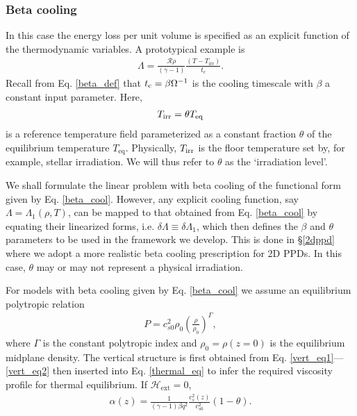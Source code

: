 \subsubsection{Beta cooling}
In this case the energy loss per unit volume is specified 
as an explicit function of the thermodynamic variables. 
A prototypical example is 
\begin{align}\label{beta_cool}
  \Lambda =
  \frac{\mathcal{R}\rho}{(\gamma-1)}\frac{\left(T-T_\mathrm{irr}\right)}{t_c}. 
\end{align}
Recall from Eq. \ref{beta_def} that 
  $t_\mathrm{c} = \beta\Omega^{-1}$ is 
the cooling timescale with $\beta$ a constant input parameter. Here, 
\begin{align}
  T_\mathrm{irr} = \theta T_\mathrm{eq}
\end{align}
is a reference temperature field parameterized as a constant 
fraction $\theta$ of the equilibrium temperature
$T_\mathrm{eq}$. Physically, $T_\mathrm{irr}$ is the floor temperature set by,
for example, stellar irradiation. We will thus refer to $\theta$ as
the `irradiation level'. %

We shall formulate the linear problem with beta cooling of the
functional form given by Eq. \ref{beta_cool}. However, any explicit cooling function, say
$\Lambda=\Lambda_1(\rho,T)$, can be mapped to that obtained from
Eq. \ref{beta_cool} by equating their linearized forms, i.e. $\delta
\Lambda \equiv \delta \Lambda_1$, which then defines the $\beta$ and
$\theta$ parameters to be used in the framework we develop. This is
done in \S\ref{2dppd} where we adopt a more realistic beta cooling 
prescription for 2D PPDs. In this case, $\theta$ may or may not
represent a physical irradiation.     

For models with beta cooling given by Eq. \ref{beta_cool} we assume an 
equilibrium polytropic relation 
\begin{align} 
  P  =
c_{s0}^2\rho_0\left(\frac{\rho}{\rho_0}\right)^\Gamma,
\end{align}
where $\Gamma$ is the constant polytropic index and $\rho_0 =
\rho(z=0)$ is the equilibrium midplane density. 
The vertical structure is first obtained from
Eq. \ref{vert_eq1}---\ref{vert_eq2} then inserted into
Eq. \ref{thermal_eq} to infer the required viscosity profile for
thermal equilibrium. If  $\mathcal{H}_\mathrm{ext}=0$, 
\begin{align}\label{alpha_beta_relation}
\alpha(z) = \frac{1}{(\gamma-1)\beta
   q^2}\frac{c_s^2(z)}{c_{s0}^2}\left(1 - \theta\right). 
\end{align}

